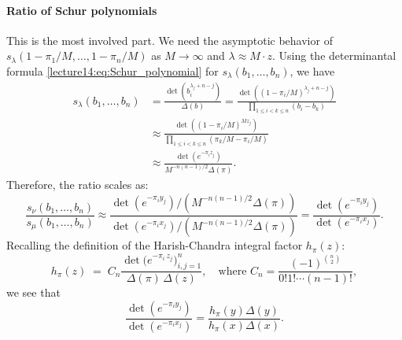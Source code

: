 \documentclass[letterpaper,11pt,oneside,reqno]{book}
\numberwithin{equation}{chapter}  %
\theoremstyle{definition}
\begin{document}
\paragraph{Ratio of Schur polynomials}
This is the most involved part. We need the asymptotic behavior of $s_\lambda(1-\pi_1/M, \dots, 1-\pi_n/M)$ as $M\to\infty$ and $\lambda \approx M \cdot z$.
Using the determinantal formula \eqref{lecture14:eq:Schur_polynomial} for $s_\lambda(b_1,\dots,b_n)$, we have
\begin{align*}
	s_\lambda(b_1,\dots,b_n) &= \frac{\det(b_i^{\lambda_j+n-j})}{\Delta(b)}
	= \frac{\det\left( (1-\pi_i/M)^{\lambda_j+n-j} \right)}{\prod_{1\le i<k\le n}(b_i-b_k)} \\
	&\approx \frac{\det\left( (1-\pi_i/M)^{M z_j} \right)}{\prod_{1\le i<k\le n}(\pi_k/M-\pi_i/M)} \\
	&\approx \frac{\det\left( e^{-\pi_i z_j} \right)}{M^{-n(n-1)/2} \Delta(\pi)}.
\end{align*}
Therefore, the ratio scales as:
\begin{equation*}
	\frac{s_{\nu}(b_1,\ldots,b_n)}{s_\mu(b_1,\ldots,b_n)}
	\approx \frac{\det(e^{-\pi_i y_j}) / (M^{-n(n-1)/2} \Delta(\pi))}{\det(e^{-\pi_i x_j}) / (M^{-n(n-1)/2} \Delta(\pi))}
	= \frac{\det(e^{-\pi_i y_j})}{\det(e^{-\pi_i x_j})}.
\end{equation*}
Recalling the definition of the Harish-Chandra integral factor $h_\pi(z)$:
\[
h_{\pi}(z)
\;=\;
C_n
\frac{\det\bigl(e^{-\pi_i\,z_j}\bigr)_{i,j=1}^n}{\Delta(\pi)\,\Delta(z)},
\quad\text{where } C_n = \frac{(-1)^{\binom n2}}{0! 1! \cdots (n-1)! },
\]
we see that
\begin{equation*}
	\frac{\det(e^{-\pi_i y_j})}{\det(e^{-\pi_i x_j})}
	= \frac{h_\pi(y) \Delta(y)}{h_\pi(x) \Delta(x)}.
\end{equation*}
\end{document}
